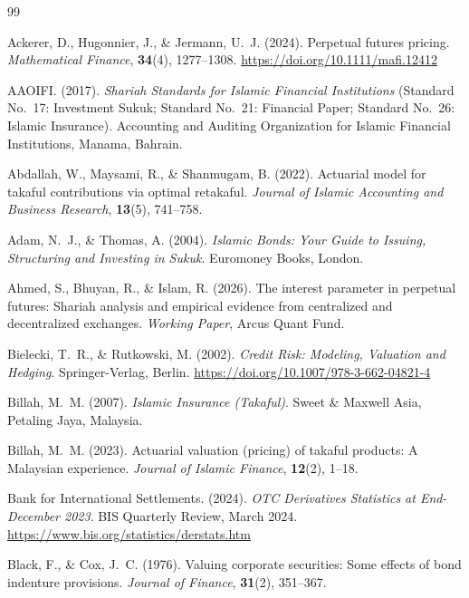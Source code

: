 \documentclass[10pt,twocolumn]{article}
\theoremstyle{plain}
\theoremstyle{definition}
\begin{document}

\begin{thebibliography}{99}

Ackerer, D., Hugonnier, J., \& Jermann, U.~J. (2024).
Perpetual futures pricing.
\textit{Mathematical Finance}, \textbf{34}(4), 1277--1308.
\url{https://doi.org/10.1111/mafi.12412}

AAOIFI. (2017).
\textit{Shariah Standards for Islamic Financial Institutions}
(Standard No.~17: Investment Sukuk; Standard No.~21: Financial
Paper; Standard No.~26: Islamic Insurance).
Accounting and Auditing Organization for Islamic Financial
Institutions, Manama, Bahrain.

Abdallah, W., Maysami, R., \& Shanmugam, B. (2022).
Actuarial model for takaful contributions via optimal retakaful.
\textit{Journal of Islamic Accounting and Business Research},
\textbf{13}(5), 741--758.

Adam, N.~J., \& Thomas, A. (2004).
\textit{Islamic Bonds: Your Guide to Issuing, Structuring and
Investing in Sukuk}.
Euromoney Books, London.

Ahmed, S., Bhuyan, R., \& Islam, R. (2026).
The interest parameter in perpetual futures: Shariah analysis
and empirical evidence from centralized and decentralized exchanges.
\textit{Working Paper}, Arcus Quant Fund.

Bielecki, T.~R., \& Rutkowski, M. (2002).
\textit{Credit Risk: Modeling, Valuation and Hedging}.
Springer-Verlag, Berlin.
\url{https://doi.org/10.1007/978-3-662-04821-4}

Billah, M.~M. (2007).
\textit{Islamic Insurance (Takaful)}.
Sweet \& Maxwell Asia, Petaling Jaya, Malaysia.

Billah, M.~M. (2023).
Actuarial valuation (pricing) of takaful products:
A Malaysian experience.
\textit{Journal of Islamic Finance}, \textbf{12}(2), 1--18.

Bank for International Settlements. (2024).
\textit{OTC Derivatives Statistics at End-December 2023}.
BIS Quarterly Review, March 2024.
\url{https://www.bis.org/statistics/derstats.htm}

Black, F., \& Cox, J.~C. (1976).
Valuing corporate securities: Some effects of bond indenture
provisions.
\textit{Journal of Finance}, \textbf{31}(2), 351--367.


\end{thebibliography}
\end{document}
